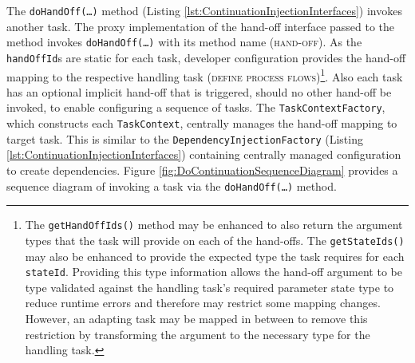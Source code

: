 \documentclass[prodmode]{style/acmlarge}
\begin{document}
The \texttt{doHandOff(\ldots)} method (Listing
\ref{lst:ContinuationInjectionInterfaces}) invokes another task.  The proxy
implementation of the hand-off interface passed to the method invokes
\texttt{doHandOff(\ldots)} with its method name (\textsc{hand-off}).  As the
\texttt{handOffId}s are static for each task, developer configuration provides
the hand-off mapping to the respective handling task (\textsc{define process
flows})\footnote{The \texttt{getHandOffIds()} method may be enhanced to also
return the argument types that the task will provide on each of the hand-offs.
The \texttt{getStateIds()} may also be enhanced to provide the expected type the
task requires for each \texttt{stateId}.  Providing this type information allows
the hand-off argument to be type validated against the handling task's required
parameter state type to reduce runtime errors and therefore may restrict some
mapping changes.  However, an adapting task may be mapped in between to remove
this restriction by transforming the argument to the necessary type for the
handling task.}.  Also each task has an optional implicit hand-off that is
triggered, should no other hand-off be invoked, to enable configuring a sequence
of tasks.  The \texttt{TaskContextFactory}, which constructs each
\texttt{TaskContext}, centrally manages the hand-off mapping to target task. 
This is similar to the \texttt{DependencyInjectionFactory} (Listing
\ref{lst:ContinuationInjectionInterfaces}) containing centrally managed
configuration to create dependencies.  Figure
\ref{fig:DoContinuationSequenceDiagram} provides a sequence diagram of invoking
a task via the \texttt{doHandOff(\ldots)} method.
\end{document}
